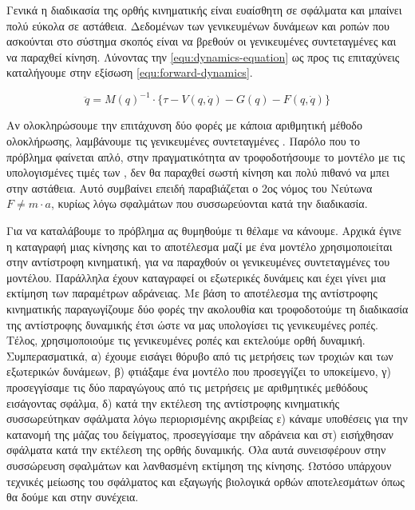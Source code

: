 Γενικά η διαδικασία της ορθής κινηματικής είναι ευαίσθητη σε σφάλματα και μπαίνει πολύ εύκολα σε αστάθεια. Δεδομένων των γενικευμένων δυνάμεων και ροπών που ασκούνται στο σύστημα σκοπός είναι να βρεθούν οι γενικευμένες συντεταγμένες  και να παραχθεί κίνηση. Λύνοντας την \ref{equ:dynamics-equation} ως προς τις επιταχύνεις καταλήγουμε στην εξίσωση \ref{equ:forward-dynamics}.

\begin{equation}
    \ddot{q} = M(q)^{-1} \cdot \{ \tau - V(q, \dot{q}) - G(q) - F(q, \dot{q})\}
    \label{equ:forward-dynamics}
\end{equation}

Αν ολοκληρώσουμε την επιτάχυνση δύο φορές με κάποια αριθμητική μέθοδο ολοκλήρωσης, λαμβάνουμε τις γενικευμένες συντεταγμένες . Παρόλο που το πρόβλημα φαίνεται απλό, στην πραγματικότητα αν τροφοδοτήσουμε το μοντέλο με τις υπολογισμένες τιμές των , δεν θα παραχθεί σωστή κίνηση και πολύ πιθανό να μπει στην αστάθεια. Αυτό συμβαίνει επειδή παραβιάζεται ο 2ος νόμος του Νεύτωνα $F \neq m \cdot a$, κυρίως λόγω σφαλμάτων που συσσωρεύονται κατά την διαδικασία.

Για να καταλάβουμε το πρόβλημα ας θυμηθούμε τι θέλαμε να κάνουμε. Αρχικά έγινε η καταγραφή μιας κίνησης και το αποτέλεσμα μαζί με ένα μοντέλο χρησιμοποιείται στην αντίστροφη κινηματική, για να παραχθούν οι γενικευμένες συντεταγμένες του μοντέλου. Παράλληλα έχουν καταγραφεί οι εξωτερικές δυνάμεις και έχει γίνει μια εκτίμηση των παραμέτρων αδράνειας. Με βάση το αποτέλεσμα της αντίστροφης κινηματικής παραγωγίζουμε δύο φορές την ακολουθία και τροφοδοτούμε τη διαδικασία της αντίστροφης δυναμικής έτσι ώστε να μας υπολογίσει τις γενικευμένες ροπές. Τέλος, χρησιμοποιούμε τις γενικευμένες ροπές και εκτελούμε ορθή δυναμική. Συμπερασματικά, α) έχουμε εισάγει θόρυβο από τις μετρήσεις των τροχιών και των εξωτερικών δυνάμεων, β) φτιάξαμε ένα μοντέλο που προσεγγίζει το υποκείμενο, γ) προσεγγίσαμε τις δύο παραγώγους από τις μετρήσεις με αριθμητικές μεθόδους εισάγοντας σφάλμα, δ) κατά την εκτέλεση της αντίστροφης κινηματικής συσσωρεύτηκαν σφάλματα λόγω περιορισμένης ακριβείας ε) κάναμε υποθέσεις για την κατανομή της μάζας του δείγματος, προσεγγίσαμε την αδράνεια και στ) εισήχθησαν σφάλματα κατά την εκτέλεση της ορθής δυναμικής. Όλα αυτά συνεισφέρουν στην συσσώρευση σφαλμάτων και λανθασμένη εκτίμηση της κίνησης. Ωστόσο υπάρχουν τεχνικές μείωσης του σφάλματος και εξαγωγής βιολογικά ορθών αποτελεσμάτων όπως θα δούμε και στην συνέχεια.
